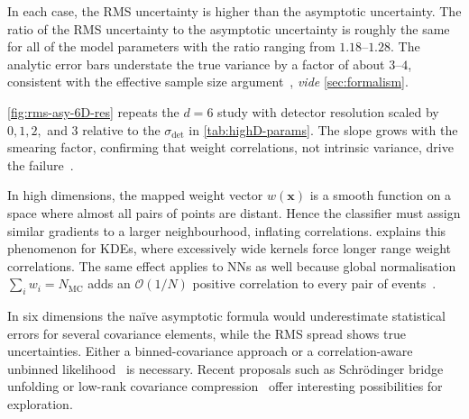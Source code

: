             In each case, the RMS uncertainty is higher than the asymptotic uncertainty.
            The ratio of the RMS uncertainty to the asymptotic uncertainty is roughly the same for all of the model parameters with the ratio ranging from \(\numrange{1.18}{1.28}\).
            The analytic error bars understate the true variance by a factor of about \(\numrange{3}{4}\), consistent with the effective sample size argument~\cite{Yang2011EffectiveAnalyses, jones_effective_2021, geyer_introduction_2011}, \textit{vide} \cref{sec:formalism}.
            
            \cref{fig:rms-asy-6D-res} repeats the \(d = 6\) study with detector resolution scaled by $0,1,2,$ and $3$ relative to the $\sigma_{\det}$ in \cref{tab:highD-params}.
            The slope grows with the smearing factor, confirming that weight correlations, not intrinsic variance, drive the failure~\cite{Langenbruch:2019nwe}.

            In high dimensions, the mapped weight vector $w(\mathbf{x})$ is a smooth function on a space where almost all pairs of points are distant.
            Hence the classifier must assign similar gradients to a larger neighbourhood, inflating correlations.
            \cite{rox818_kernel_2025} explains this phenomenon for KDEs, where excessively wide kernels force longer range weight correlations.
            The same effect applies to NNs as well because global normalisation $\sum_i w_i=N_{\text{MC}}$ adds an $\mathcal O(1/N)$ positive correlation to {every} pair of events~\cite{ATLAS:2014ipf}.

            In six dimensions the na\"ive asymptotic formula would underestimate statistical errors for several covariance elements, while the RMS spread shows true uncertainties.
            Either a binned-covariance approach  or a correlation-aware unbinned likelihood~\cite{Adye2017RooUnfoldTh} is necessary.
            Recent proposals such as Schr\"odinger bridge unfolding or low-rank covariance compression~\cite{wu_high-dimensional_2018} offer interesting possibilities for exploration.


